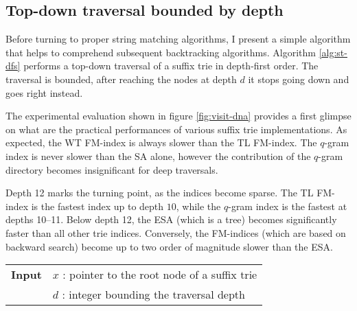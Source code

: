 \begin{table}[b]
\begin{center}
\caption[Index construction times and memory footprints]{Index construction times and memory footprints.}
\sffamily

\label{tab:index:construction}
\end{center}
\end{table}

\subsection{Top-down traversal bounded by depth}
\label{sec:index:algo:traversal}

Before turning to proper string matching algorithms, I present a simple algorithm that helps to comprehend subsequent backtracking algorithms.
Algorithm \ref{alg:st-dfs} performs a top-down traversal of a suffix trie in depth-first order.
The traversal is bounded, \ie after reaching the nodes at depth $d$ it stops going down and goes right instead.

The experimental evaluation shown in figure \ref{fig:visit-dna} provides a first glimpse on what are the practical performances of various suffix trie implementations.
As expected, the WT FM-index is always slower than the TL FM-index.
The $q$-gram index is never slower than the SA alone, however the contribution of the $q$-gram directory becomes insignificant for deep traversals.

Depth 12 marks the turning point, as the indices become sparse.
The TL FM-index is the fastest index up to depth $10$, while the $q$-gram index is the fastest at depths 10--11.
Below depth 12, the ESA (which is a tree) becomes significantly faster than all other trie indices.
Conversely, the FM-indices (which are based on backward search) become up to two order of magnitude slower than the ESA.

\begin{figure*}[t]
\begin{center}
\begin{minipage}[t]{.7\textwidth}
\begin{algorithm}[H]
\begin{tabular}{ll}
\textbf{Input}  & $x$ : pointer to the root node of a suffix trie\\
 			    & $d$ : integer bounding the traversal depth\\
\end{tabular}
\begin{algorithmic}[1]
		\Repeat
			\State {}
		\Until {}
	\EndIf
\EndIf
\end{algorithmic}
\label{alg:st-dfs}
\end{algorithm}
\end{minipage}
\end{center}
\end{figure*}

